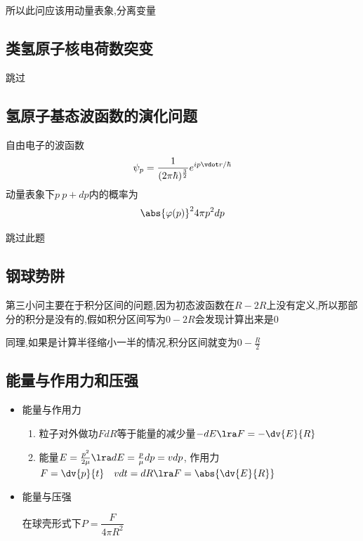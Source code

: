             所以此问应该用动量表象,分离变量

        \subsection{类氢原子核电荷数突变}
            跳过

        \subsection{氢原子基态波函数的演化问题}
            自由电子的波函数
            $$ \psi_{p} = \frac{1}{(2\pi \hbar)^{\frac{3}{2 }}} e^{ip \vdot r/\hbar} $$
            动量表象下$p~p+dp$内的概率为
            $$ \abs{\varphi(p)}^{2} 4\pi p^{2} dp $$

            跳过此题

        \subsection{钢球势阱}
            第三小问主要在于积分区间的问题,因为初态波函数在$R-2R$上没有定义,所以那部分的积分是没有的,假如积分区间写为$0-2R$会发现计算出来是0

            同理,如果是计算半径缩小一半的情况,积分区间就变为$0-\frac{R}{2}$

        \subsection{能量与作用力和压强}
            \begin{formal}
                \begin{itemize}
                    \item 能量与作用力
                    \begin{enumerate}
                        \item 粒子对外做功$ F dR $等于能量的减少量$ - dE \lra F = - \dv{E}{R}$
                        \item 能量$ E = \frac{p^{2}}{2\mu} \lra dE = \frac{p}{\mu} dp = v dp $,
                        作用力$ F = \dv{p}{t}  \quad v dt = dR \lra F = \abs{\dv{E}{R}}$
                    \end{enumerate}
                    \item 能量与压强 
                    
                    在球壳形式下$ P = \dfrac{F}{4\pi R^{2}} $
                \end{itemize}
            \end{formal}

